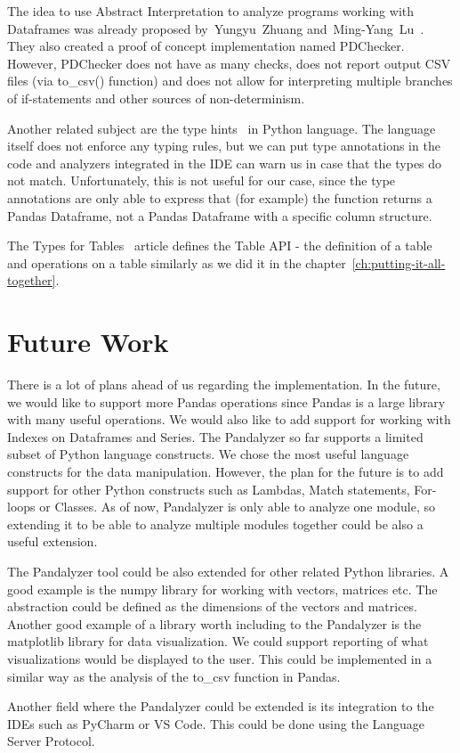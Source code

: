 The idea to use Abstract Interpretation to analyze programs working with Dataframes was already proposed by~Yungyu~Zhuang
and~Ming-Yang~Lu~\cite{Zhuang:2022:TypeChecking}.
They also created a proof of concept implementation named PDChecker.
However, PDChecker does not have as many checks, does not report output CSV files (via to\_csv() function) and
does not allow for interpreting multiple branches of if-statements and other sources of non-determinism.

Another related subject are the type hints~\cite{python_typing} in Python language.
The language itself does not enforce any typing rules, but we can put type annotations in the code and analyzers
integrated in the IDE can warn us in case that the types do not match.
Unfortunately, this is not useful for our case, since the type annotations are only able to express that
(for example) the function returns a Pandas Dataframe, not a Pandas Dataframe with a specific column structure.

The Types for Tables~\cite{types_for_tables} article defines the Table API - the definition of a table and operations on
a table similarly as we did it in the chapter~\ref{ch:putting-it-all-together}.


\section*{Future Work}\label{sec:future-work}

There is a lot of plans ahead of us regarding the implementation.
In the future, we would like to support more Pandas operations since Pandas is a large library with many useful
operations.
We would also like to add support for working with Indexes on Dataframes and Series.
The Pandalyzer so far supports a limited subset of Python language constructs.
We chose the most useful language constructs for the data manipulation.
However, the plan for the future is to add support for other Python constructs such as Lambdas, Match statements,
For-loops or Classes.
As of now, Pandalyzer is only able to analyze one module, so extending it to be able to analyze multiple modules together
could be also a useful extension.

The Pandalyzer tool could be also extended for other related Python libraries.
A good example is the numpy library for working with vectors, matrices etc.
The abstraction could be defined as the dimensions of the vectors and matrices.
Another good example of a library worth including to the Pandalyzer is the matplotlib library for data visualization.
We could support reporting of what visualizations would be displayed to the user.
This could be implemented in a similar way as the analysis of the to\_csv function in Pandas.

Another field where the Pandalyzer could be extended is its integration to the IDEs such as PyCharm or VS Code.
This could be done using the Language Server Protocol.